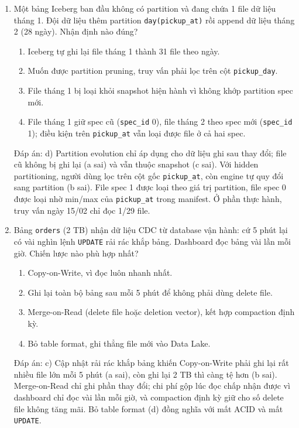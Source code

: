 \documentclass[12pt]{article}
\begin{document}
\begin{enumerate}[label=\textbf{\arabic*.}, leftmargin=1.6em, itemsep=1.2em]
\item Một bảng Iceberg ban đầu không có partition và đang chứa 1 file dữ liệu tháng 1. Đội dữ liệu thêm partition \texttt{day(pickup\_at)} rồi append dữ liệu tháng 2 (28 ngày). Nhận định nào đúng?

\begin{enumerate}[label=\alph*), leftmargin=2.2em, itemsep=1pt]
    \item Iceberg tự ghi lại file tháng 1 thành 31 file theo ngày.
    \item Muốn được partition pruning, truy vấn phải lọc trên cột \texttt{pickup\_day}.
    \item File tháng 1 bị loại khỏi snapshot hiện hành vì không khớp partition spec mới.
    \item File tháng 1 giữ spec cũ (\texttt{spec\_id} 0), file tháng 2 theo spec mới (\texttt{spec\_id} 1); điều kiện trên \texttt{pickup\_at} vẫn loại được file ở cả hai spec.
\end{enumerate}
\begin{guidelinebox}{Đáp án: d)}
Partition evolution chỉ áp dụng cho dữ liệu ghi sau thay đổi; file cũ không bị ghi lại (a sai) và vẫn thuộc snapshot (c sai). Với hidden partitioning, người dùng lọc trên cột gốc \texttt{pickup\_at}, còn engine tự quy đổi sang partition (b sai). File spec 1 được loại theo giá trị partition, file spec 0 được loại nhờ min/max của \texttt{pickup\_at} trong manifest. Ở phần thực hành, truy vấn ngày 15/02 chỉ đọc 1/29 file.
\end{guidelinebox}

\item Bảng \texttt{orders} (2 TB) nhận dữ liệu CDC từ database vận hành: cứ 5 phút lại có vài nghìn lệnh \texttt{UPDATE} rải rác khắp bảng. Dashboard đọc bảng vài lần mỗi giờ. Chiến lược nào phù hợp nhất?

\begin{enumerate}[label=\alph*), leftmargin=2.2em, itemsep=1pt]
    \item Copy-on-Write, vì đọc luôn nhanh nhất.
    \item Ghi lại toàn bộ bảng sau mỗi 5 phút để không phải dùng delete file.
    \item Merge-on-Read (delete file hoặc deletion vector), kết hợp compaction định kỳ.
    \item Bỏ table format, ghi thẳng file mới vào Data Lake.
\end{enumerate}
\begin{guidelinebox}{Đáp án: c)}
Cập nhật rải rác khắp bảng khiến Copy-on-Write phải ghi lại rất nhiều file lớn mỗi 5 phút (a sai), còn ghi lại 2 TB thì càng tệ hơn (b sai). Merge-on-Read chỉ ghi phần thay đổi; chi phí gộp lúc đọc chấp nhận được vì dashboard chỉ đọc vài lần mỗi giờ, và compaction định kỳ giữ cho số delete file không tăng mãi. Bỏ table format (d) đồng nghĩa với mất ACID và mất \texttt{UPDATE}.
\end{guidelinebox}


\end{enumerate}
\end{document}
